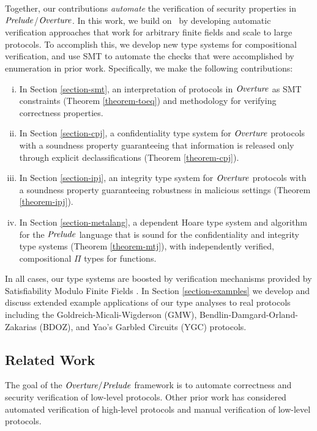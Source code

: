 Together, our contributions \emph{automate} the verification of security
properties in $\mathit{Prelude}$/$\mathit{Overture}$. In this work, we build on~\cite{skalka-near-ppdp24}
by developing automatic verification approaches that work for arbitrary
finite fields and scale to large protocols. To accomplish this, we develop new
type systems for compositional verification, and use SMT to automate the checks
that were accomplished by enumeration in prior work. Specifically, we make the
following contributions:
%
\begin{enumerate}[i.]
\item In Section \ref{section-smt}, an interpretation of protocols in
  $\mathit{Overture}$ as SMT constraints (Theorem \ref{theorem-toeq}) and
  methodology for verifying correctness properties.
\item In Section \ref{section-cpj}, a confidentiality type system for
  $\mathit{Overture}$ protocols with a soundness property guaranteeing that
  information is released only through explicit declassifications
  (Theorem \ref{theorem-cpj}).
\item In Section \ref{section-ipj}, an integrity type system for
  $\mathit{Overture}$ protocols with a soundness property guaranteeing
  robustness in malicious settings (Theorem \ref{theorem-ipj}).
\item In Section \ref{section-metalang}, a dependent Hoare type system and
  algorithm for the $\mathit{Prelude}$ language that is sound for the
  confidentiality and integrity type systems (Theorem
  \ref{theorem-mtj}), with independently verified, compositional $\Pi$
  types for functions.
\end{enumerate}
In all cases, our type systems are boosted by verification mechanisms
provided by Satisfiability Modulo Finite Fields \cite{SMFF}. In
Section \ref{section-examples} we develop and discuss extended example
applications of our type analyses to real protocols including
the Goldreich-Micali-Wigderson (GMW), Bendlin-Damgard-Orland-Zakarias
(BDOZ), and Yao's Garbled Circuits (YGC) protocols.

\subsection{Related Work}
\label{section-related-work}

The goal of the $\mathit{Overture}/\mathit{Prelude}$ framework is to automate
correctness and security verification of low-level protocols.  Other
prior work has considered automated verification of high-level
protocols and manual verification of low-level protocols.

